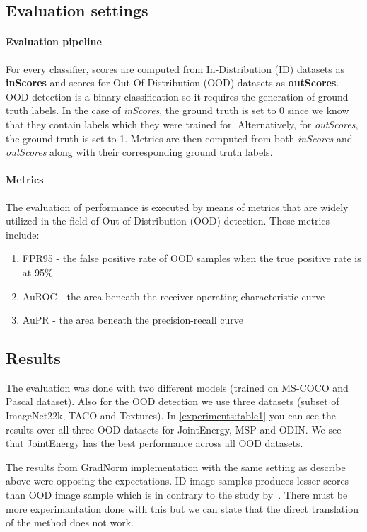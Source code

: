 \subsection{Evaluation settings}
\paragraph{Evaluation pipeline}
For every classifier, scores are computed from In-Distribution (ID) datasets as \textbf{inScores} 
and scores for Out-Of-Distribution (OOD) datasets as \textbf{outScores}. 
OOD detection is a binary classification so it requires the generation of ground truth labels. 
In the case of \textit{inScores}, the ground truth is set to 0 since we know that they contain labels which they were trained for. 
Alternatively, for \textit{outScores}, the ground truth is set to 1. 
Metrics are then computed from both \textit{inScores} and \textit{outScores} along with their corresponding ground truth labels.

\paragraph{Metrics}
The evaluation of performance is executed by means of metrics that are widely utilized in the field of Out-of-Distribution (OOD) detection. 
These metrics include:

\begin{enumerate}[label=(\alph*)]
\item FPR95 - the false positive rate of OOD samples when the true positive rate is at 95\%
\item AuROC - the area beneath the receiver operating characteristic curve
\item AuPR - the area beneath the precision-recall curve
\end{enumerate}

\subsection{Results}
The evaluation was done with two different models (trained on MS-COCO and Pascal dataset). 
Also for the OOD detection we use three datasets (subset of ImageNet22k, TACO and Textures).
In \autoref{experiments:table1} you can see the results over all three OOD datasets for JointEnergy, MSP and ODIN. 
We see that JointEnergy has the best performance across all OOD datasets.

The results from GradNorm implementation with the same setting as describe above were opposing the expectations. 
ID image samples produces lesser scores than OOD image sample which is in contrary to the study by~\cite{huangImportanceGradientsDetecting2021}.
There must be more experimantation done with this but we can state that the direct translation of the method does not work. 


